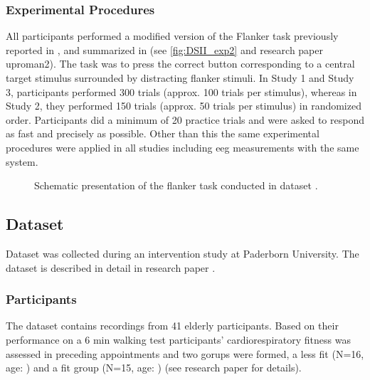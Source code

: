 \subsubsection{Experimental Procedures}
\label{methods:datasets:II:experiment}
All participants performed a modified version of the Flanker task previously reported in \cite{Reuter2017, Winneke2012, Winneke2019}, and summarized in \cite{Reuter2019} (see \autoref{fig:DSII_exp2} and research paper uproman{2}). The task was to press the correct button corresponding to a central target stimulus surrounded by distracting flanker stimuli. In Study 1 and Study 3, participants performed 300 trials (approx. 100 trials per stimulus), whereas in Study 2, they performed 150 trials (approx. 50 trials per stimulus) in randomized order. Participants did a minimum of 20 practice trials and were asked to respond as fast and precisely as possible. Other than this the same experimental procedures were applied in all studies including \gls{eeg} measurements with the same system. 

\begin{figure}[h]
\begin{center}

\caption[Schematic presentation of the flanker task conducted in dataset .]{Schematic presentation of the flanker task conducted in dataset .}
\label{fig:DSII_exp2}
\end{center}
\end{figure}

\subsection{Dataset }
\label{methods:datasets:III}
Dataset  was collected during an intervention study at Paderborn University. The dataset is described in detail in research paper  \cite{Goelz2021b}. 

\subsubsection{Participants}
\label{methods:datasets:III:participants}
The dataset contains recordings from 41 elderly participants. Based on their performance on a 6 min walking test participants’ cardiorespiratory fitness was assessed in preceding appointments and two gorups were formed, a less fit (N=16, age: ) and a fit group (N=15, age: ) (see research paper  \cite{Goelz2021b} for details).

